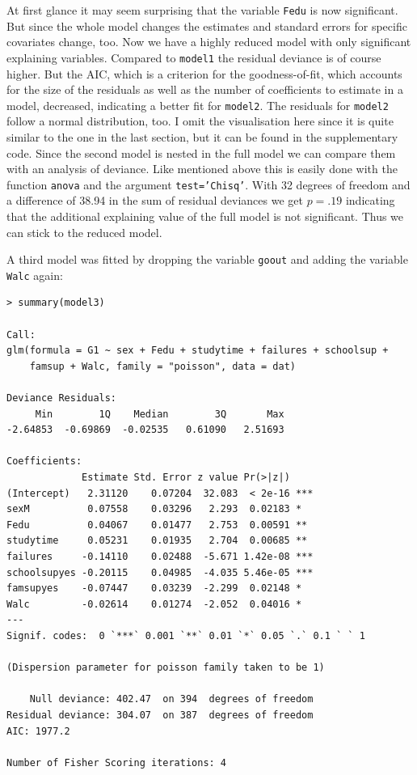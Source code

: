 At first glance it may seem surprising that the variable \texttt{Fedu} is now significant. But since the whole model changes the estimates and standard errors for specific covariates change, too. Now we have a highly reduced model with only significant explaining variables. Compared to \texttt{model1} the residual deviance is of course higher. But the AIC, which is a criterion for the goodness-of-fit, which accounts for the size of the residuals as well as the number of coefficients to estimate in a model, decreased, indicating a better fit for \texttt{model2}. The residuals for \texttt{model2} follow a normal distribution, too. I omit the visualisation here since it is quite similar to the one in the last section, but it can be found in the supplementary code. Since the second model is nested in the full model we can compare them with an analysis of deviance. Like mentioned above this is easily done with the function \texttt{anova} and the argument \texttt{test='Chisq'}. With 32 degrees of freedom and a difference of 38.94 in the sum of residual deviances we get $p=.19$ indicating that the additional explaining value of the full model is not significant. Thus we can stick to the reduced model. 

A third model was fitted by dropping the variable \texttt{goout} and adding the variable \texttt{Walc} again: 
\begin{small}\begin{verbatim} 
> summary(model3)

Call:
glm(formula = G1 ~ sex + Fedu + studytime + failures + schoolsup + 
    famsup + Walc, family = "poisson", data = dat)

Deviance Residuals: 
     Min        1Q    Median        3Q       Max  
-2.64853  -0.69869  -0.02535   0.61090   2.51693  

Coefficients:
             Estimate Std. Error z value Pr(>|z|)    
(Intercept)   2.31120    0.07204  32.083  < 2e-16 ***
sexM          0.07558    0.03296   2.293  0.02183 *  
Fedu          0.04067    0.01477   2.753  0.00591 ** 
studytime     0.05231    0.01935   2.704  0.00685 ** 
failures     -0.14110    0.02488  -5.671 1.42e-08 ***
schoolsupyes -0.20115    0.04985  -4.035 5.46e-05 ***
famsupyes    -0.07447    0.03239  -2.299  0.02148 *  
Walc         -0.02614    0.01274  -2.052  0.04016 *  
---
Signif. codes:  0 `***` 0.001 `**` 0.01 `*` 0.05 `.` 0.1 ` ` 1

(Dispersion parameter for poisson family taken to be 1)

    Null deviance: 402.47  on 394  degrees of freedom
Residual deviance: 304.07  on 387  degrees of freedom
AIC: 1977.2

Number of Fisher Scoring iterations: 4
\end{verbatim}\end{small}  

